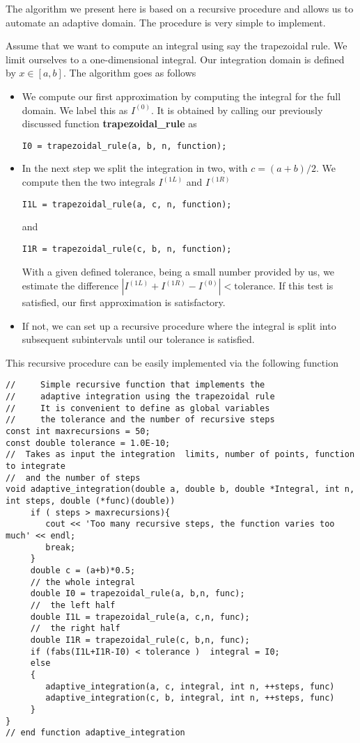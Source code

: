 The algorithm we present here is based on a recursive procedure and allows us to
automate an adaptive domain. The procedure is very simple to implement. 

Assume that we want to compute an integral using say the trapezoidal rule. We limit ourselves
to a one-dimensional integral.
Our integration domain is defined by $x\in [a,b]$. The algorithm goes as follows
\begin{itemize}
\item We compute our first approximation by computing the integral for the full domain. We label this as $I^{(0)}$. It is obtained by calling our previously discussed function
{\bf trapezoidal\_rule} as
\lstset{language=c++} 
\begin{lstlisting} 
I0 = trapezoidal_rule(a, b, n, function);    
\end{lstlisting}
\item In the next step  we split the integration in two, with $c= (a+b)/2$. We compute then the two integrals $I^{(1L)}$ and $I^{(1R)}$
\lstset{language=c++}
\begin{lstlisting}
I1L = trapezoidal_rule(a, c, n, function);
\end{lstlisting}
and 
\lstset{language=c++}
\begin{lstlisting}
I1R = trapezoidal_rule(c, b, n, function);
\end{lstlisting}
With a given defined tolerance, being a small number provided by us, we estimate the difference
$|I^{(1L)}+I^{(1R)}-I^{(0)}| < \mathrm{tolerance}$. If this test is satisfied, our first approximation is satisfactory.
\item If not, we can set up a recursive procedure where the integral is split into subsequent
subintervals until our tolerance is satisfied. 
\end{itemize}
This recursive procedure can be easily implemented via the following function
\lstset{language=c++}
\begin{lstlisting}
//     Simple recursive function that implements the 
//     adaptive integration using the trapezoidal rule
//     It is convenient to define as global variables 
//     the tolerance and the number of recursive steps
const int maxrecursions = 50;
const double tolerance = 1.0E-10;
//  Takes as input the integration  limits, number of points, function to integrate
//  and the number of steps 
void adaptive_integration(double a, double b, double *Integral, int n, int steps, double (*func)(double))
     if ( steps > maxrecursions){ 
        cout << 'Too many recursive steps, the function varies too much' << endl;
        break;
     }
     double c = (a+b)*0.5;  
     // the whole integral
     double I0 = trapezoidal_rule(a, b,n, func);
     //  the left half
     double I1L = trapezoidal_rule(a, c,n, func);
     //  the right half
     double I1R = trapezoidal_rule(c, b,n, func);
     if (fabs(I1L+I1R-I0) < tolerance )  integral = I0;
     else
     { 
        adaptive_integration(a, c, integral, int n, ++steps, func)
        adaptive_integration(c, b, integral, int n, ++steps, func)
     }
}
// end function adaptive_integration
\end{lstlisting}
